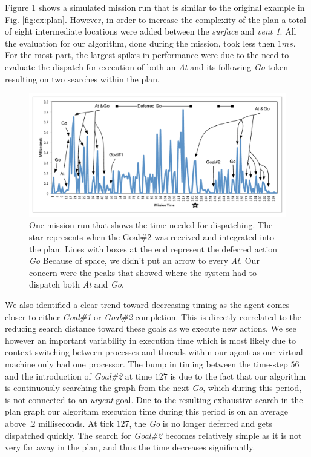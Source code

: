 Figure \ref{fig:example_run} shows a simulated mission run that is
similar to the original example in Fig. \ref{fig:ex:plan}.  However,
in order to increase the complexity of the plan a total of eight
intermediate locations were added between the {\em surface} and {\em
  vent 1}. All the evaluation for our algorithm, done during the mission,
took less then $1ms$. For the most part, the largest spikes in
performance were due to the need to evaluate the dispatch for
execution of both an {\em At} and its following {\em Go} token
resulting on two searches within the plan.

\begin{figure}[b]
  \centering
  \includegraphics[width=\columnwidth]{figs/example_run.pdf}
  \caption{\small One mission run that shows the time needed for
    dispatching. The star represents when the Goal\#2 was received and
    integrated into the plan. Lines with boxes at the end represent
    the deferred action {\em Go} Because of space, we didn't put an
    arrow to every {\em At}. Our concern were the peaks that showed
    where the system had to dispatch both {\em At} and {\em Go}. }
  \label{fig:example_run}
\end{figure}

We also identified a clear trend toward decreasing timing as the agent
comes closer to either {\em Goal\#1} or {\em Goal\#2} completion. This
is directly correlated to the reducing search distance toward these
goals as we execute new actions.  We see however an important
variability in execution time which is most likely due to context
switching between processes and threads within our agent as our
virtual machine only had one processor.  The bump in timing between
the time-step $56$ and the introduction of {\em Goal\#2} at time $127$
is due to the fact that our algorithm is continuously searching the
graph from the next {\em Go}, which during this period, is not
connected to an {\em urgent} goal. Due to the resulting exhaustive
search in the plan graph our algorithm execution time during this
period is on an average above $.2$ milliseconds. At tick $127$, the
{\em Go} is no longer deferred and gets dispatched quickly. The search
for {\em Goal\#2} becomes relatively simple as it is not very far away
in the plan, and thus the time decreases significantly.

